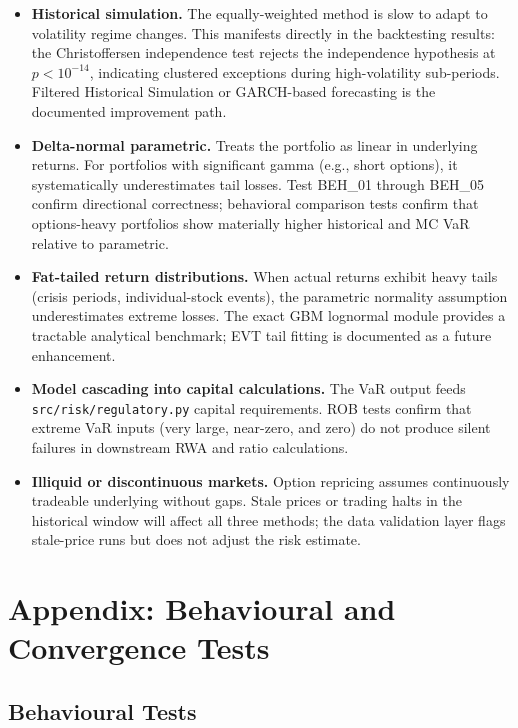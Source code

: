 \documentclass[11pt]{article}
\newcommand{\code}[1]{\texttt{#1}}
\begin{document}
\begin{itemize}
  \item \textbf{Historical simulation.}  The equally-weighted method is
    slow to adapt to volatility regime changes.  This manifests directly
    in the backtesting results: the Christoffersen independence test
    rejects the independence hypothesis at $p < 10^{-14}$, indicating
    clustered exceptions during high-volatility sub-periods.  Filtered
    Historical Simulation or GARCH-based forecasting is the documented
    improvement path.
  \item \textbf{Delta-normal parametric.}  Treats the portfolio as linear
    in underlying returns.  For portfolios with significant gamma (e.g.,
    short options), it systematically underestimates tail losses.  Test
    BEH\_01 through BEH\_05 confirm directional correctness; behavioral
    comparison tests confirm that options-heavy portfolios show materially
    higher historical and MC VaR relative to parametric.
  \item \textbf{Fat-tailed return distributions.}  When actual returns
    exhibit heavy tails (crisis periods, individual-stock events), the
    parametric normality assumption underestimates extreme losses.  The
    exact GBM lognormal module provides a tractable analytical benchmark;
    EVT tail fitting is documented as a future enhancement.
  \item \textbf{Model cascading into capital calculations.}  The VaR
    output feeds \code{src/risk/regulatory.py} capital requirements.
    ROB tests confirm that extreme VaR inputs (very large, near-zero, and
    zero) do not produce silent failures in downstream RWA and ratio
    calculations.
  \item \textbf{Illiquid or discontinuous markets.}  Option repricing
    assumes continuously tradeable underlying without gaps.  Stale prices
    or trading halts in the historical window will affect all three
    methods; the data validation layer flags stale-price runs but does
    not adjust the risk estimate.
\end{itemize}

\section{Appendix: Behavioural and Convergence Tests}

\subsection{Behavioural Tests}
\end{document}
